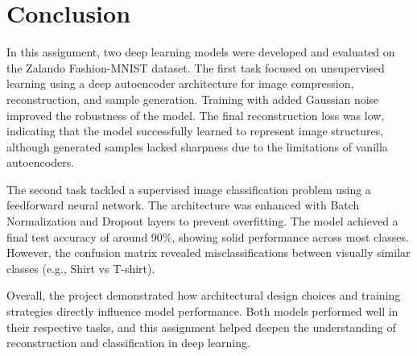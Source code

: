 \documentclass[12pt]{article}
\begin{document}
\section*{Conclusion}

In this assignment, two deep learning models were developed and evaluated on the Zalando Fashion-MNIST dataset. The first task focused on unsupervised learning using a deep autoencoder architecture for image compression, reconstruction, and sample generation. Training with added Gaussian noise improved the robustness of the model. The final reconstruction loss was low, indicating that the model successfully learned to represent image structures, although generated samples lacked sharpness due to the limitations of vanilla autoencoders.

The second task tackled a supervised image classification problem using a feedforward neural network. The architecture was enhanced with Batch Normalization and Dropout layers to prevent overfitting. The model achieved a final test accuracy of around 90\%, showing solid performance across most classes. However, the confusion matrix revealed misclassifications between visually similar classes (e.g., Shirt vs T-shirt).

Overall, the project demonstrated how architectural design choices and training strategies directly influence model performance. Both models performed well in their respective tasks, and this assignment helped deepen the understanding of reconstruction and classification in deep learning.
\end{document}
